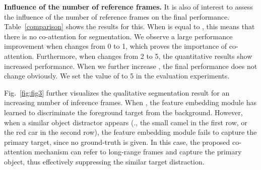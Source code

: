 \documentclass[10pt,twocolumn,letterpaper]{article}
\begin{document}
\begin{table}
	\centering
\vspace{1pt}	
\caption{\small Quantitative performance on the test sequences of FBMS~\cite{DBLP:journals/pami/OchsMB14} using region similarity (mean ). }
\vspace*{-8pt}
	\label{FBMS}
\end{table}

\noindent\textbf{Influence of the number of reference frames.} It is also of interest to assess the influence of the number of reference frames  on the final performance. Table~\ref{comparison} shows the results for this. When  is equal to , this means that there is no co-attention for segmentation.  We observe  a large performance improvement when  changes from 0 to 1, which proves the importance of co-attention. Furthermore, when  changes from 2 to 5, the quantitative results show increased performance.  When we further increase
, the final performance does not change obviously. We set the value of  to 5 in the evaluation experiments.

Fig.~\ref{fig:fig3} further visualizes the qualitative segmentation result for an increasing number of inference frames. When , the feature embedding module has learned to discriminate the foreground target from the background. However, when a similar object distractor  appears (\eg., the small camel in the first row, or the red car in the second row), the feature embedding module fails to capture the primary target, since no ground-truth is given. In this case, the proposed co-attention mechanism can refer to  long-range frames and capture the primary object, thus effectively suppressing the similar target distraction.
\end{document}
